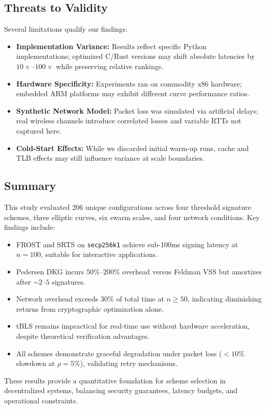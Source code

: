 \subsection{Threats to Validity}
\label{subsec:threats_validity}

Several limitations qualify our findings:
\begin{itemize}
    \item \textbf{Implementation Variance:} Results reflect specific Python implementations; optimized C/Rust versions may shift absolute latencies by $10\times$--$100\times$ while preserving relative rankings.
    \item \textbf{Hardware Specificity:} Experiments ran on commodity x86 hardware; embedded ARM platforms may exhibit different curve performance ratios.
    \item \textbf{Synthetic Network Model:} Packet loss was simulated via artificial delays; real wireless channels introduce correlated losses and variable RTTs not captured here.
    \item \textbf{Cold-Start Effects:} While we discarded initial warm-up runs, cache and TLB effects may still influence variance at scale boundaries.
\end{itemize}

\subsection{Summary}
\label{subsec:summary}

This study evaluated 206 unique configurations across four threshold signature schemes, three elliptic curves, six swarm scales, and four network conditions. Key findings include:

\begin{itemize}
    \item FROST and SRTS on \texttt{secp256k1} achieve sub-100ms signing latency at $n=100$, suitable for interactive applications.
    \item Pedersen DKG incurs $50\%$--$200\%$ overhead versus Feldman VSS but amortizes after $\sim 2$--$5$ signatures.
    \item Network overhead exceeds $30\%$ of total time at $n \geq 50$, indicating diminishing returns from cryptographic optimization alone.
    \item tBLS remains impractical for real-time use without hardware acceleration, despite theoretical verification advantages.
    \item All schemes demonstrate graceful degradation under packet loss ($<10\%$ slowdown at $\rho=5\%$), validating retry mechanisms.
\end{itemize}

These results provide a quantitative foundation for scheme selection in decentralized systems, balancing security guarantees, latency budgets, and operational constraints.
